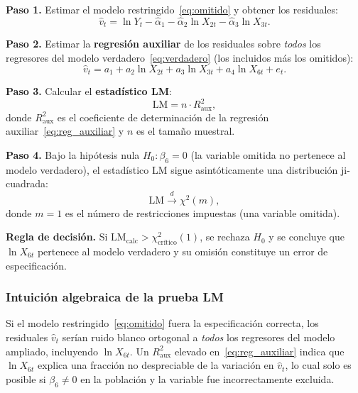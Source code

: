 \documentclass[12pt, letterpaper]{article}
\begin{document}
\textbf{Paso 1.} Estimar el modelo restringido~\eqref{eq:omitido} y
obtener los residuales:
\begin{equation}
  \hat{v}_t = \ln Y_t
    - \hat{\alpha}_1 - \hat{\alpha}_2 \ln X_{2t} - \hat{\alpha}_3 \ln X_{3t}.
  \label{eq:residuales}
\end{equation}

\textbf{Paso 2.} Estimar la \textbf{regresión auxiliar} de los residuales
sobre \emph{todos} los regresores del modelo verdadero~\eqref{eq:verdadero}
(los incluidos más los omitidos):
\begin{equation}
  \hat{v}_t = a_1 + a_2 \ln X_{2t} + a_3 \ln X_{3t}
              + a_4 \ln X_{6t} + e_t.
  \label{eq:reg_auxiliar}
\end{equation}

\textbf{Paso 3.} Calcular el \textbf{estadístico LM}:
\begin{equation}
  \mathrm{LM} = n \cdot R_{\text{aux}}^2,
  \label{eq:lm}
\end{equation}
donde $R_{\text{aux}}^2$ es el coeficiente de determinación de la
regresión auxiliar~\eqref{eq:reg_auxiliar} y $n$ es el tamaño muestral.

\textbf{Paso 4.} Bajo la hipótesis nula $H_0: \beta_6 = 0$ (la variable
omitida no pertenece al modelo verdadero), el estadístico LM sigue
asintóticamente una distribución ji-cuadrada:
\begin{equation}
  \mathrm{LM} \xrightarrow{d} \chi^2(m),
  \label{eq:dist_lm}
\end{equation}
donde $m = 1$ es el número de restricciones impuestas (una variable omitida).

\textbf{Regla de decisión.} Si $\mathrm{LM}_{\text{calc}} > \chi^2_{\text{crítico}}(1)$,
se rechaza $H_0$ y se concluye que $\ln X_{6t}$ pertenece al modelo
verdadero y su omisión constituye un error de especificación.

\subsubsection*{Intuición algebraica de la prueba LM}

Si el modelo restringido~\eqref{eq:omitido} fuera la especificación
correcta, los residuales $\hat{v}_t$ serían ruido blanco ortogonal a
\emph{todos} los regresores del modelo ampliado, incluyendo $\ln X_{6t}$.
Un $R_{\text{aux}}^2$ elevado en~\eqref{eq:reg_auxiliar} indica que
$\ln X_{6t}$ explica una fracción no despreciable de la variación en
$\hat{v}_t$, lo cual solo es posible si $\beta_6 \neq 0$ en la población
y la variable fue incorrectamente excluida.
\end{document}
